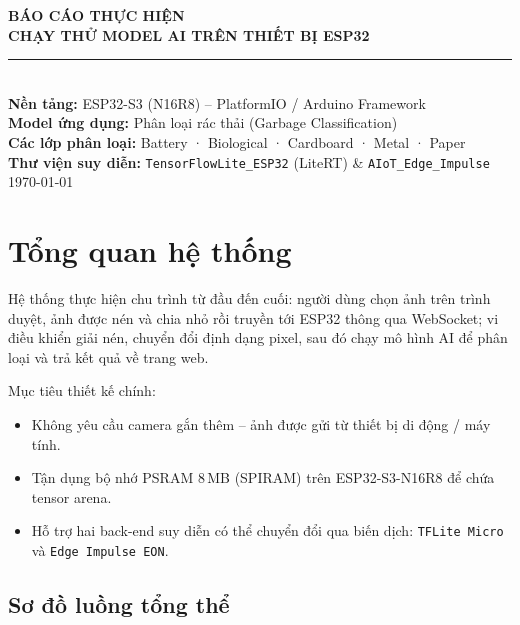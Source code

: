 \documentclass[12pt,a4paper]{article}
\begin{document}
\begin{titlepage}
  \centering
  \vspace*{1.5cm}
  {\Large \textbf{BÁO CÁO THỰC HIỆN}}\\[0.4cm]
  {\large \textbf{CHẠY THỬ MODEL AI TRÊN THIẾT BỊ ESP32}}\\[0.3cm]
  \rule{\linewidth}{0.8pt}\\[2cm]
  {\normalsize
    \textbf{Nền tảng:} ESP32-S3 (N16R8) -- PlatformIO / Arduino Framework\\[0.4cm]
    \textbf{Model ứng dụng:} Phân loại rác thải (Garbage Classification)\\[0.4cm]
    \textbf{Các lớp phân loại:} Battery · Biological · Cardboard · Metal · Paper\\[0.4cm]
    \textbf{Thư viện suy diễn:}
      \texttt{TensorFlowLite\_ESP32} (LiteRT) \& \texttt{AIoT\_Edge\_Impulse}
  }\\[2.5cm]
  {\small \today}
  \vfill
\end{titlepage}

\tableofcontents
\newpage

\section{Tổng quan hệ thống}

Hệ thống thực hiện chu trình từ đầu đến cuối: người dùng chọn ảnh trên trình duyệt, ảnh được nén và chia nhỏ rồi truyền tới ESP32 thông qua WebSocket; vi điều khiển giải nén, chuyển đổi định dạng pixel, sau đó chạy mô hình AI để phân loại và trả kết quả về trang web.

Mục tiêu thiết kế chính:
\begin{itemize}
  \item Không yêu cầu camera gắn thêm -- ảnh được gửi từ thiết bị di động / máy tính.
  \item Tận dụng bộ nhớ PSRAM 8\,MB (SPIRAM) trên ESP32-S3-N16R8 để chứa tensor arena.
  \item Hỗ trợ hai back-end suy diễn có thể chuyển đổi qua biến dịch: \texttt{TFLite Micro} và \texttt{Edge Impulse EON}.
\end{itemize}

\subsection*{Sơ đồ luồng tổng thể}
\end{document}
